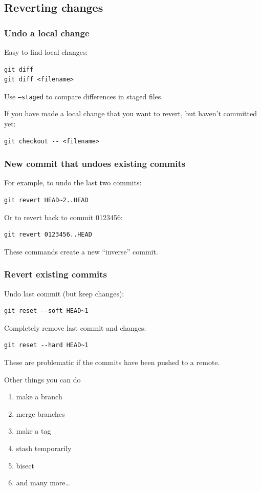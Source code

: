 \documentclass{beamer}
\begin{document}
\subsection{Reverting changes}
\begin{frame}[fragile]
  \frametitle{Undo a local change}
Easy to find local changes:
  \begin{lstlisting}
git diff
git diff <filename>
  \end{lstlisting}
Use {\tt --staged} to compare differences in staged files.

\vspace{1em}

If you have made a local change that you want to revert, but haven't committed yet:
  \begin{lstlisting}
git checkout -- <filename>
  \end{lstlisting}
\end{frame}

\begin{frame}[fragile]
  \frametitle{New commit that undoes existing commits}
For example, to undo the last two commits:
  \begin{lstlisting}
git revert HEAD~2..HEAD
  \end{lstlisting}
Or to revert back to commit 0123456:
  \begin{lstlisting}
git revert 0123456..HEAD
  \end{lstlisting}
These commands create a new ``inverse'' commit.
\end{frame}

\begin{frame}[fragile]
  \frametitle{Revert existing commits}
Undo last commit (but keep changes):
  \begin{lstlisting}
git reset --soft HEAD~1
  \end{lstlisting}
Completely remove last commit and changes:
  \begin{lstlisting}
git reset --hard HEAD~1
  \end{lstlisting}
These are problematic if the commits have been pushed to a remote.
\end{frame}

\begin{frame}{Other things you can do}
  \begin{enumerate}
    \item make a branch
    \item merge branches
    \item make a tag
    \item stash temporarily
    \item bisect
    \item and many more\ldots
  \end{enumerate}
\end{frame}
\end{document}
